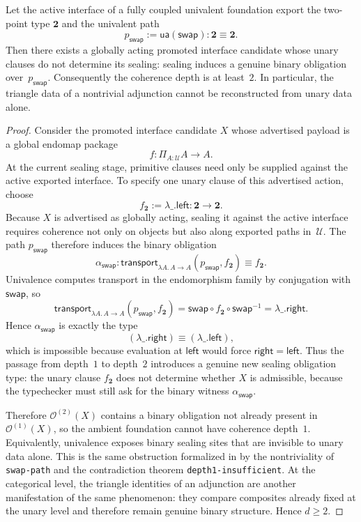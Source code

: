 \documentclass{lmcs}
\newcommand{\U}{\mathcal{U}}
\newcommand{\Ocal}{\mathcal{O}}
\begin{document}
\begin{thm}
\label{thm:adjunction}
Let the active interface of a fully coupled univalent foundation export the two-point type $\mathbf{2}$ and the univalent path
\[
  p_{\mathsf{swap}} := \mathsf{ua}(\mathsf{swap}) : \mathbf{2} \equiv \mathbf{2}.
\]
Then there exists a globally acting promoted interface candidate whose unary clauses do not determine its sealing: sealing induces a genuine binary obligation over~$p_{\mathsf{swap}}$. Consequently the coherence depth is at least~$2$. In particular, the triangle data of a nontrivial adjunction cannot be reconstructed from unary data alone.
\end{thm}

\begin{proof}
Consider the promoted interface candidate $X$ whose advertised payload is a global endomap package
\[
  f : \Pi_{A:\U} A \to A.
\]
At the current sealing stage, primitive clauses need only be supplied against the active exported interface. To specify one unary clause of this advertised action, choose
\[
  f_{\mathbf{2}} := \lambda\_ . \mathsf{left} : \mathbf{2} \to \mathbf{2}.
\]
Because $X$ is advertised as globally acting, sealing it against the active interface requires coherence not only on objects but also along exported paths in~$\U$. The path $p_{\mathsf{swap}}$ therefore induces the binary obligation
\[
  \alpha_{\mathsf{swap}}
  :
  \mathsf{transport}_{\lambda A.\, A \to A}(p_{\mathsf{swap}}, f_{\mathbf{2}})
  \equiv
  f_{\mathbf{2}}.
\]
Univalence computes transport in the endomorphism family by conjugation with $\mathsf{swap}$, so
\[
  \mathsf{transport}_{\lambda A.\, A \to A}(p_{\mathsf{swap}}, f_{\mathbf{2}})
  =
  \mathsf{swap} \circ f_{\mathbf{2}} \circ \mathsf{swap}^{-1}
  =
  \lambda\_ . \mathsf{right}.
\]
Hence $\alpha_{\mathsf{swap}}$ is exactly the type
\[
  (\lambda\_ . \mathsf{right}) \equiv (\lambda\_ . \mathsf{left}),
\]
which is impossible because evaluation at $\mathsf{left}$ would force $\mathsf{right} = \mathsf{left}$. Thus the passage from depth~$1$ to depth~$2$ introduces a genuine new sealing obligation type: the unary clause $f_{\mathbf{2}}$ does not determine whether $X$ is admissible, because the typechecker must still ask for the binary witness $\alpha_{\mathsf{swap}}$.

Therefore $\Ocal^{(2)}(X)$ contains a binary obligation not already present in $\Ocal^{(1)}(X)$, so the ambient foundation cannot have coherence depth~$1$. Equivalently, univalence exposes binary sealing sites that are invisible to unary data alone. This is the same obstruction formalized in  by the nontriviality of \texttt{swap-path} and the contradiction theorem \texttt{depth1-insufficient}. At the categorical level, the triangle identities of an adjunction are another manifestation of the same phenomenon: they compare composites already fixed at the unary level and therefore remain genuine binary structure. Hence $d \geq 2$.
\end{proof}
\end{document}
